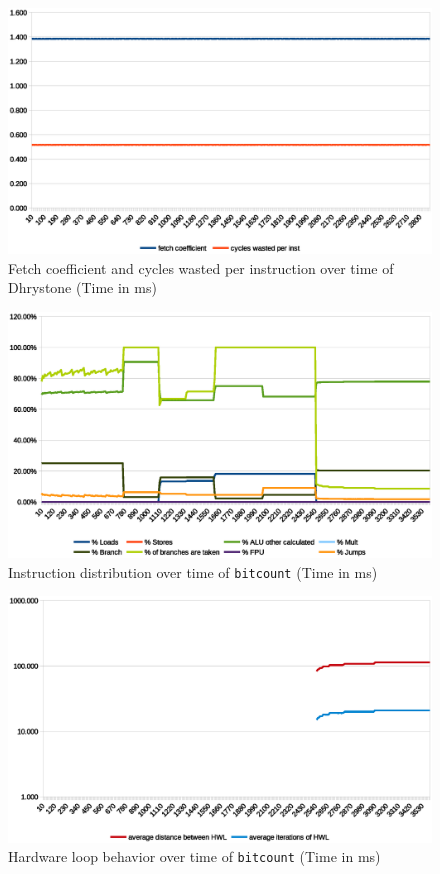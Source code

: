 \documentclass[../bachelor_paper.tex]{subfiles}
\begin{document}
\begin{figure}
    \centering
    \includegraphics[width=\textwidth]{img/graph/riscv/dhrystone_fetch_waste.eps}
    \caption{Fetch coefficient and cycles wasted per instruction over time of Dhrystone (Time in ms)}
    \label{fig:res/dhrystone/fetch_waste}
\end{figure}

\begin{figure}
    \centering
    \includegraphics[width=\textwidth]{img/graph/mibench/bitcount_inst.eps}
    \caption{Instruction distribution over time of \texttt{bitcount} (Time in ms)}
    \label{fig:res/bitcount/inst}
\end{figure}

\begin{figure}
    \centering
    \includegraphics[width=\textwidth]{img/graph/mibench/bitcount_hwl.eps}
    \caption{Hardware loop behavior over time of \texttt{bitcount} (Time in ms)}
    \label{fig:res/bitcount/hwl}
\end{figure}
\end{document}
